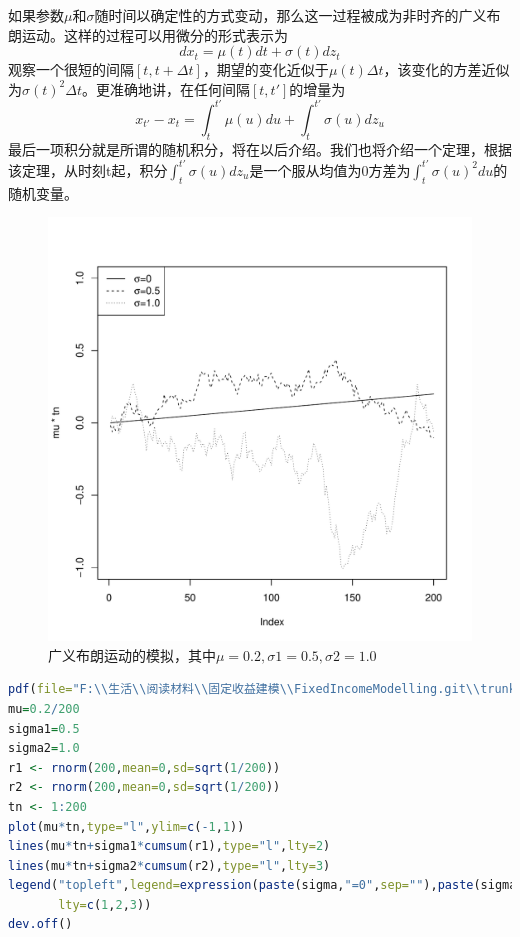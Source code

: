 \documentclass[UTF8]{ctexart}
\begin{document}
如果参数$\mu$和$\sigma$随时间以确定性的方式变动，那么这一过程被成为非时齐的广义布朗运动。这样的过程可以用微分的形式表示为
$$dx_t=\mu(t)dt+\sigma(t)dz_t$$
观察一个很短的间隔$[t,t+\Delta t]$，期望的变化近似于$\mu(t)\Delta t$，该变化的方差近似为$\sigma(t)^2 \Delta t$。更准确地讲，在任何间隔$[t,t']$的增量为
$$x_{t'}-x_t=\int_t^{t'}\mu(u)du+\int_t^{t'}\sigma(u)dz_u$$
最后一项积分就是所谓的随机积分，将在以后介绍。我们也将介绍一个定理，根据该定理，从时刻t起，积分$\int_t^{t'}\sigma(u)dz_u$是一个服从均值为0方差为$\int_t^{t'}\sigma(u)^2du$的随机变量。
\begin{figure}[H]
    \centering
    \includegraphics[scale=0.6]{P43.pdf}
    \caption*{广义布朗运动的模拟，其中$\mu=0.2,\sigma 1=0.5,\sigma 2=1.0$}
\end{figure}

\begin{lstlisting}[language=R]  
pdf(file="F:\\生活\\阅读材料\\固定收益建模\\FixedIncomeModelling.git\\trunk\\P43.pdf")
mu=0.2/200
sigma1=0.5
sigma2=1.0
r1 <- rnorm(200,mean=0,sd=sqrt(1/200))
r2 <- rnorm(200,mean=0,sd=sqrt(1/200))
tn <- 1:200
plot(mu*tn,type="l",ylim=c(-1,1))
lines(mu*tn+sigma1*cumsum(r1),type="l",lty=2)
lines(mu*tn+sigma2*cumsum(r2),type="l",lty=3)
legend("topleft",legend=expression(paste(sigma,"=0",sep=""),paste(sigma,"=0.5",sep=""),paste(sigma,"=1.0",sep="")),
       lty=c(1,2,3))
dev.off()
\end{lstlisting}
\end{document}
